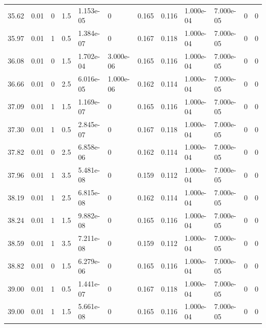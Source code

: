 \documentclass[preview]{standalone}
\begin{document}
{{{\begin{tabular}{L{1.2cm}C{1.2cm} C{0.3cm}C{0.5cm} C{1.4cm}C{1.4cm} C{1.4cm}C{1.4cm} C{1.6cm}C{1.6cm} C{1.6cm}C{1.6cm}}
  35.62  &  0.01  & 0     & 1.5 &  1.153e-05  & 0  &  0.165&   0.116& 1.000e-04 & 7.000e-05   &  0 & 0  \\ 
  35.97  &  0.01  & 1     & 0.5 &  1.384e-07  & 0  &  0.167&   0.118& 1.000e-04 & 7.000e-05   &  0 & 0  \\ 
  36.08  &  0.01  & 0     & 1.5 &  1.702e-04  & 3.000e-06  &  0.165&   0.116& 1.000e-04 & 7.000e-05   &  0 & 0  \\ 
  36.66  &  0.01  & 0     & 2.5 &  6.016e-05  & 1.000e-06  &  0.162&   0.114& 1.000e-04 & 7.000e-05   &  0 & 0  \\ 
  37.09  &  0.01  & 1     & 1.5 &  1.169e-07  & 0  &  0.165&   0.116& 1.000e-04 & 7.000e-05   &  0 & 0  \\ 
  37.30  &  0.01  & 1     & 0.5 &  2.845e-07  & 0  &  0.167&   0.118& 1.000e-04 & 7.000e-05   &  0 & 0  \\ 
  37.82  &  0.01  & 0     & 2.5 &  6.858e-06  & 0  &  0.162&   0.114& 1.000e-04 & 7.000e-05   &  0 & 0  \\ 
  37.96  &  0.01  & 1     & 3.5 &  5.481e-08  & 0  &  0.159&   0.112& 1.000e-04 & 7.000e-05   &  0 & 0  \\ 
  38.19  &  0.01  & 1     & 2.5 &  6.815e-08  & 0  &  0.162&   0.114& 1.000e-04 & 7.000e-05   &  0 & 0  \\ 
  38.24  &  0.01  & 1     & 1.5 &  9.882e-08  & 0  &  0.165&   0.116& 1.000e-04 & 7.000e-05   &  0 & 0  \\ 
  38.59  &  0.01  & 1     & 3.5 &  7.211e-08  & 0  &  0.159&   0.112& 1.000e-04 & 7.000e-05   &  0 & 0  \\ 
  38.82  &  0.01  & 0     & 1.5 &  6.279e-06  & 0  &  0.165&   0.116& 1.000e-04 & 7.000e-05   &  0 & 0  \\ 
  39.00  &  0.01  & 1     & 0.5 &  1.441e-07  & 0  &  0.167&   0.118& 1.000e-04 & 7.000e-05   &  0 & 0  \\ 
  39.00  &  0.01  & 1     & 1.5 &  5.661e-08  & 0  &  0.165&   0.116& 1.000e-04 & 7.000e-05   &  0 & 0  \\ 
\hline 
\end{tabular} 

}}}
\end{document}
